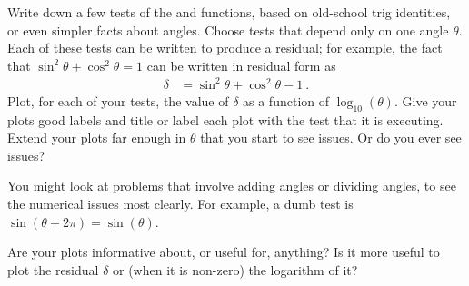 \documentclass[12pt]{article}
\begin{document}
\begin{problem}
  Write down a few tests of the  and  functions, based on old-school trig identities, or even simpler facts about angles.
  Choose tests that depend only on one angle $\theta$.
  Each of these tests can be written to produce a residual; for example, the fact that $\sin^2\theta+\cos^2\theta=1$ can be written in residual form as
  \begin{align}
    \delta &= \sin^2\theta + \cos^2\theta - 1 ~.
  \end{align}
  Plot, for each of your tests, the value of $\delta$ as a function of $\log_{10}(\theta)$.
  Give your plots good labels and title or label each plot with the test that it is executing.
  Extend your plots far enough in $\theta$ that you start to see issues.
  Or do you ever see issues?
\end{problem}

\begin{note}
  You might look at problems that involve adding angles or dividing angles, to see the numerical issues most clearly.
  For example, a dumb test is $\sin(\theta + 2\pi) = \sin(\theta)$.
\end{note}

\begin{note}
  Are your plots informative about, or useful for, anything?
  Is it more useful to plot the residual $\delta$ or (when it is non-zero) the logarithm of it?
\end{note}
\end{document}
